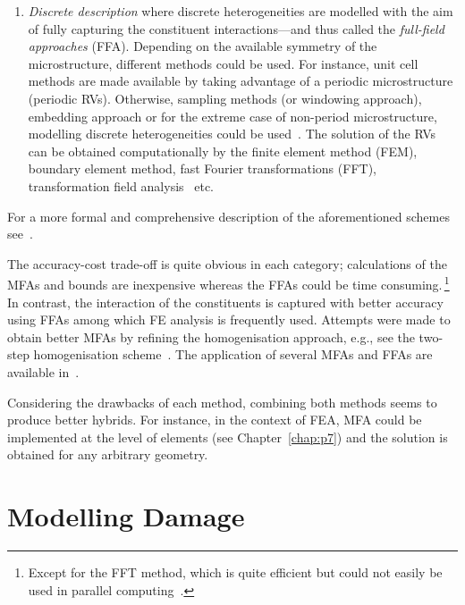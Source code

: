 \begin{enumerate}
		\item \textit{Discrete description} where discrete heterogeneities are modelled with the aim of fully capturing the constituent interactions---and thus called the \textit{full-field approaches} (FFA). Depending on the available symmetry of the microstructure, different methods could be used. For instance, unit cell methods are made available by taking advantage of a periodic microstructure (periodic RVs). Otherwise, sampling methods (or windowing approach), embedding approach or for the extreme case of non-period microstructure, modelling discrete heterogeneities could be used~\autocite{Bohm.2020}. The solution of the RVs can be obtained computationally by the finite element method (FEM), boundary element method, fast Fourier transformations (FFT), transformation field analysis~\autocite{Dvorak.1992,Dvorak.1992b} etc.
	\end{enumerate}
	For a more formal and comprehensive description of the aforementioned schemes see~\autocite{Mura.1987,NematNasser.1993}.

	The accuracy-cost trade-off is quite obvious in each category; calculations of the MFAs and bounds are inexpensive whereas the FFAs could be time consuming.\,\footnote{Except for the FFT method, which is quite efficient but could not easily be used in parallel computing~\autocite{Matous.2017}.} In contrast, the interaction of the constituents is captured with better accuracy using FFAs among which FE analysis is frequently used. Attempts were made to obtain better MFAs by refining the homogenisation approach, e.g., see the two-step homogenisation scheme~\autocite{Pierard.2004,Doghri.2006}. The application of several MFAs and FFAs are available in~\autocite{Muller.2015}.
	
	Considering the drawbacks of each method, combining both methods seems to produce better hybrids. For instance, in the context of FEA, MFA could be implemented at the level of elements (see Chapter~\ref{chap:p7}) and the solution is obtained for any arbitrary geometry.

\section{Modelling Damage}
